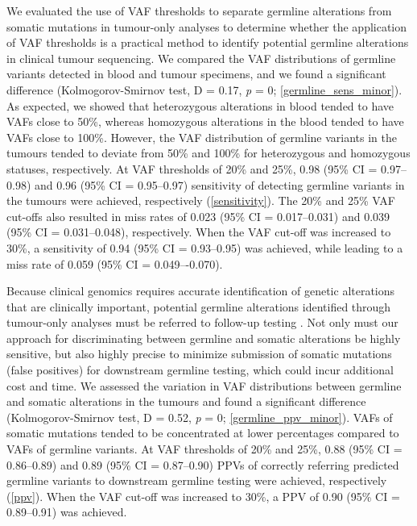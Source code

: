 \documentclass{bmcart}
\begin{document}
We evaluated the use of VAF thresholds to separate germline alterations from somatic mutations in tumour-only analyses to determine whether the application of VAF thresholds is a practical method to identify potential germline alterations in clinical tumour sequencing. We compared the VAF distributions of germline variants detected in blood and tumour specimens, and we found a significant difference (Kolmogorov-Smirnov test, D = 0.17, \textit{p} = 0; \autoref{germline_sens_minor}). As expected, we showed that heterozygous alterations in blood tended to have VAFs close to 50\%, whereas homozygous alterations in the blood tended to have VAFs close to 100\%. However, the VAF distribution of germline variants in the tumours tended to deviate from 50\% and 100\% for heterozygous and homozygous statuses, respectively. At VAF thresholds of 20\% and 25\%, 0.98 (95\% CI = 0.97--0.98) and 0.96 (95\% CI = 0.95--0.97) sensitivity of detecting germline variants in the tumours were achieved, respectively (\autoref{sensitivity}). The 20\% and 25\% VAF cut-offs also resulted in miss rates of 0.023 (95\% CI = 0.017--0.031) and 0.039 (95\% CI = 0.031–0.048), respectively. When the VAF cut-off was increased to 30\%, a sensitivity of 0.94 (95\% CI = 0.93--0.95) was achieved, while leading to a miss rate of 0.059 (95\% CI = 0.049–-0.070).

Because clinical genomics requires accurate identification of genetic alterations that are clinically important, potential germline alterations identified through tumour-only analyses must be referred to follow-up testing \cite{Raymond2016, Bombard2014, Green2013}. Not only must our approach for discriminating between germline and somatic alterations be highly sensitive, but also highly precise to minimize submission of somatic mutations (false positives) for downstream germline testing, which could incur additional cost and time. We assessed the variation in VAF distributions between germline and somatic alterations in the tumours and found a significant difference (Kolmogorov-Smirnov test, D = 0.52, \textit{p} = 0; \autoref{germline_ppv_minor}). VAFs of somatic mutations tended to be concentrated at lower percentages compared to VAFs of germline variants. At VAF thresholds of 20\% and 25\%, 0.88 (95\% CI = 0.86--0.89) and 0.89 (95\% CI = 0.87--0.90) PPVs of correctly referring predicted germline variants to downstream germline testing were achieved, respectively (\autoref{ppv}). When the VAF cut-off was increased to 30\%, a PPV of 0.90 (95\% CI = 0.89--0.91) was achieved.
\end{document}
